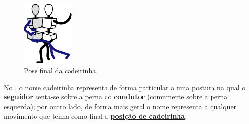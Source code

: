 \begin{figure}
  \vspace{-10pt}
  \centering
    \includegraphics[width=0.23\textwidth]{chapters/cap-historia-passos/cadeirinha.eps}
  \caption{Pose final da  cadeirinha.}
  \label{fig:cadeirinhastickman}
  \vspace{-10pt}
\end{figure}
No \AnoLivro, o nome cadeirinha representa de forma particular a uma postura na qual o \hyperref[def:Seguidor]{\textbf{seguidor}} 
senta-se sobre a perna do \hyperref[def:Condutor]{\textbf{condutor}}  (comumente sobre a perna esquerda);
por outro lado, de forma mais geral  o nome representa a qualquer movimento que tenha como final a 
\hyperref[def:cadeirinha-position]{\textbf{posição de cadeirinha}}.

